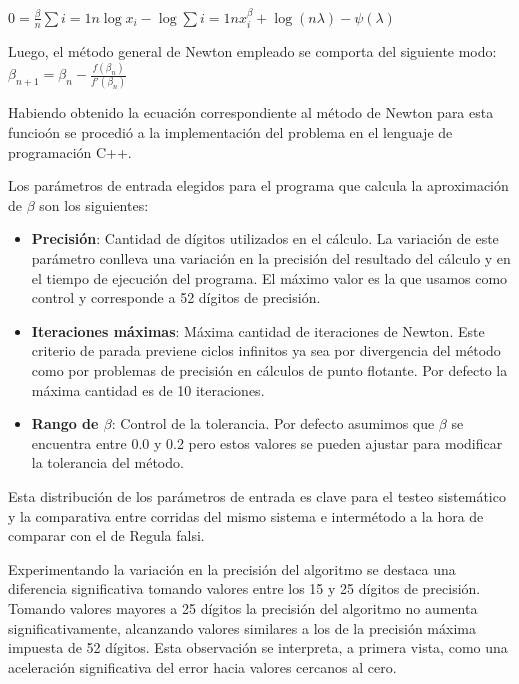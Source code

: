 $0 = \frac{\beta}{n}\sum{i=1}{n}\log x_i - \log \sum{i=1}{n}x_i^{\beta} + \log(n\lambda)-\psi(\lambda)$

Luego, el m\'etodo general de Newton empleado se comporta del siguiente modo: \\

$\beta_{n+1} = \beta_{n} - \frac{f(\beta_{n})}{f'(\beta_{n})}$

Habiendo obtenido la ecuaci\'on correspondiente al m\'etodo de Newton para esta funcio\'on se procedi\'o a la implementaci\'on del problema en el lenguaje de programaci\'on C++.

Los par\'ametros de entrada elegidos para el programa que calcula la aproximaci\'on de $\beta$ son los siguientes:

\begin{itemize}
  \item \textbf{Precisi\'on}: Cantidad de d\'igitos utilizados en el c\'alculo. La variaci\'on de este par\'ametro conlleva una variaci\'on en la precisi\'on del resultado del c\'alculo y en el tiempo de ejecuci\'on del programa. El m\'aximo valor es la que usamos como control y corresponde a 52 d\'igitos de precisi\'on.

  \item \textbf{Iteraciones m\'aximas}: M\'axima cantidad de iteraciones de Newton. Este criterio de parada previene ciclos infinitos ya sea por divergencia del m\'etodo como por problemas de precisi\'on en c\'alculos de punto flotante. Por defecto la m\'axima cantidad es de 10 iteraciones.

  \item \textbf{Rango de $\beta$}: Control de la tolerancia. Por defecto asumimos que $\beta$ se encuentra entre 0.0 y 0.2 pero estos valores se pueden ajustar para modificar la tolerancia del m\'etodo.
\end{itemize}

Esta distribuci\'on de los par\'ametros de entrada es clave para el testeo sistem\'atico y la comparativa entre corridas del mismo sistema e interm\'etodo a la hora de comparar con el de Regula falsi.

Experimentando la variaci\'on en la precisi\'on del algoritmo se destaca una diferencia significativa tomando valores entre los 15 y 25 d\'igitos de precisi\'on. Tomando valores mayores a 25 d\'igitos la precisi\'on del algoritmo no aumenta significativamente, alcanzando valores similares a los de la precisi\'on m\'axima impuesta de 52 d\'igitos. Esta observaci\'on se interpreta, a primera vista, como una aceleraci\'on significativa del error hacia valores cercanos al cero.

